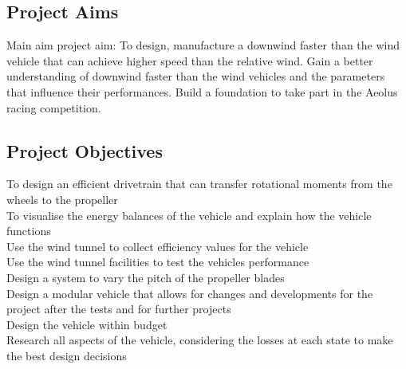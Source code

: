 \subsection{Project Aims}

Main aim project aim: To design, manufacture a downwind faster than the wind vehicle that can achieve higher speed than the relative wind.
Gain a better understanding of downwind faster than the wind vehicles and the parameters that influence their performances.
Build a foundation to take part in the Aeolus racing competition.

\subsection{Project Objectives}

To design an efficient drivetrain that can transfer rotational moments from the wheels to the propeller
\\To visualise the energy balances of the vehicle and explain how the vehicle functions
\\Use the wind tunnel to collect efficiency values for the vehicle
\\Use the wind tunnel facilities to test the vehicles performance
\\Design a system to vary the pitch of the propeller blades
\\Design a modular vehicle that allows for changes and developments for the project after the tests and for further projects 
\\Design the vehicle within budget
\\Research all aspects of the vehicle, considering the losses at each state to make the best design decisions
